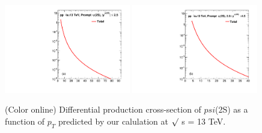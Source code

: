 \documentclass[aps,prc,preprint,superscriptaddress,showpacs,showkeys,amsmath]{revtex4-1}
\begin{document}
\begin{figure}
\includegraphics[width=0.49\textwidth]{Figures/Predict/Fig_ATLAS_D2NDPtDy_RootS13TeV_DirectPsi_Y2525.pdf}
\includegraphics[width=0.49\textwidth]{Figures/Predict/Fig_ALICE_D2NDPtDy_RootS13TeV_DirectPsi_Y2045.pdf}
\caption{(Color online) Differential production cross-section of $psi$(2S) as a function of $p_{T}$ 
  predicted by our calulation at $\surd$ s = 13 TeV.}
\label{Fig:SigmaPsi}
\end{figure}












\end{document}
